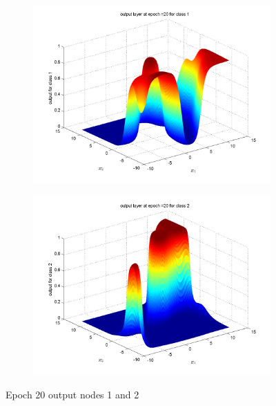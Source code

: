 \documentclass{article}
\begin{document}
\begin{figure}
\begin{subfigure}{.5\textwidth}
  \centering
  \includegraphics[width=.8\linewidth]{Classification/overlapping/20_1}
 
\end{subfigure}%
\begin{subfigure}{.5\textwidth}
  \centering
  \includegraphics[width=.8\linewidth]{Classification/overlapping/20_2}
  \end{subfigure}
\caption{Epoch 20 output nodes 1 and 2}
\end{figure}
\end{document}
